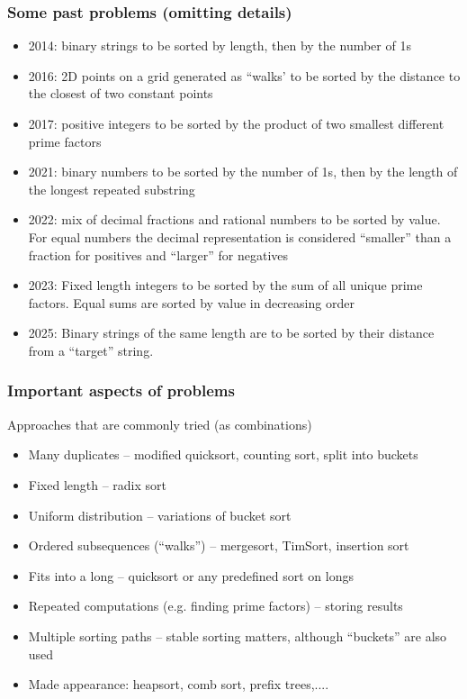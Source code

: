 \documentclass{beamer}
\begin{document}
\begin{frame}
\frametitle{Some past problems (omitting details)}
\begin{itemize}
\item 2014: binary strings to be sorted by length, then by the number of 1s
\item 2016: 2D points on a grid generated as ``walks' to be sorted by the distance to the closest of two  constant points 
\item 2017: positive integers to be sorted by the product of two smallest different prime factors
\item 2021: binary numbers to be sorted by the number of 1s, then by the length of the longest repeated substring
\item 2022: mix of decimal fractions and rational numbers to be sorted  by value.  For equal numbers the decimal representation is considered ``smaller'' than a fraction for positives and ``larger'' for negatives 
\item 2023: Fixed length integers to be sorted by the sum of all unique prime factors. Equal sums are sorted by value in decreasing order
\item 2025: Binary strings of the same length are to be sorted by their distance from a ``target'' string. 
\end{itemize}
\end{frame}

\begin{frame}
\frametitle{Important aspects of problems}
Approaches that are commonly tried (as combinations)
\begin{itemize}
\item Many duplicates -- modified quicksort, counting sort, split into buckets
\item Fixed length -- radix sort
\item Uniform distribution -- variations of bucket sort
\item Ordered subsequences (``walks'') -- mergesort, TimSort, insertion sort
\item Fits into a long -- quicksort or any predefined sort on longs
\item Repeated computations (e.g. finding prime factors) -- storing results
\item Multiple sorting paths -- stable sorting matters, although ``buckets'' are also used
\item Made appearance: heapsort, comb sort, prefix trees,....
\end{itemize}
\end{frame}
\end{document}
